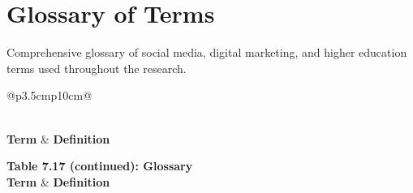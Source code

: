 \documentclass[12pt]{report}
\begin{document}
\chapter{Glossary of Terms}

Comprehensive glossary of social media, digital marketing, and higher education terms used throughout the research.

\begin{longtable}{@{}p{3.5cm}p{10cm}@{}}
\caption{Table 7.17: Research Terminology Glossary} \\
\toprule
\textbf{Term} & \textbf{Definition} \\
\midrule
\endfirsthead

%
{{\bfseries Table 7.17 (continued): Glossary}} \\
\toprule
\textbf{Term} & \textbf{Definition} \\
\midrule
\endhead

\midrule
{} \\
\endfoot

\bottomrule
\endlastfoot


\end{longtable}
\end{document}

